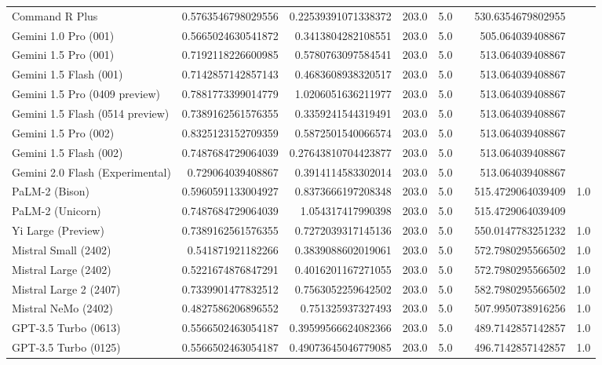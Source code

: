 \begin{table}[htp]
{\begin{tabular}{lrrrrrrr}
Command R Plus & 0.5763546798029556 & 0.22539391071338372 & 203.0 & 5.0 &  & 530.6354679802955 &  \\
Gemini 1.0 Pro (001) & 0.5665024630541872 & 0.3413804282108551 & 203.0 & 5.0 &  & 505.064039408867 &  \\
Gemini 1.5 Pro (001) & 0.7192118226600985 & 0.5780763097584541 & 203.0 & 5.0 &  & 513.064039408867 &  \\
Gemini 1.5 Flash (001) & 0.7142857142857143 & 0.4683608938320517 & 203.0 & 5.0 &  & 513.064039408867 &  \\
Gemini 1.5 Pro (0409 preview) & 0.7881773399014779 & 1.0206051636211977 & 203.0 & 5.0 &  & 513.064039408867 &  \\
Gemini 1.5 Flash (0514 preview) & 0.7389162561576355 & 0.3359241544319491 & 203.0 & 5.0 &  & 513.064039408867 &  \\
Gemini 1.5 Pro (002) & 0.8325123152709359 & 0.5872501540066574 & 203.0 & 5.0 &  & 513.064039408867 &  \\
Gemini 1.5 Flash (002) & 0.7487684729064039 & 0.27643810704423877 & 203.0 & 5.0 &  & 513.064039408867 &  \\
Gemini 2.0 Flash (Experimental) & 0.729064039408867 & 0.3914114583302014 & 203.0 & 5.0 &  & 513.064039408867 &  \\
PaLM-2 (Bison) & 0.5960591133004927 & 0.8373666197208348 & 203.0 & 5.0 &  & 515.4729064039409 & 1.0 \\
PaLM-2 (Unicorn) & 0.7487684729064039 & 1.054317417990398 & 203.0 & 5.0 &  & 515.4729064039409 &  \\
Yi Large (Preview) & 0.7389162561576355 & 0.7272039317145136 & 203.0 & 5.0 &  & 550.0147783251232 & 1.0 \\
Mistral Small (2402) & 0.541871921182266 & 0.3839088602019061 & 203.0 & 5.0 &  & 572.7980295566502 & 1.0 \\
Mistral Large (2402) & 0.5221674876847291 & 0.4016201167271055 & 203.0 & 5.0 &  & 572.7980295566502 & 1.0 \\
Mistral Large 2 (2407) & 0.7339901477832512 & 0.7563052259642502 & 203.0 & 5.0 &  & 582.7980295566502 & 1.0 \\
Mistral NeMo (2402) & 0.4827586206896552 & 0.751325937327493 & 203.0 & 5.0 &  & 507.9950738916256 & 1.0 \\
GPT-3.5 Turbo (0613) & 0.5566502463054187 & 0.39599566624082366 & 203.0 & 5.0 &  & 489.7142857142857 & 1.0 \\
GPT-3.5 Turbo (0125) & 0.5566502463054187 & 0.49073645046779085 & 203.0 & 5.0 &  & 496.7142857142857 & 1.0 \\

\end{tabular}}
\end{table}
